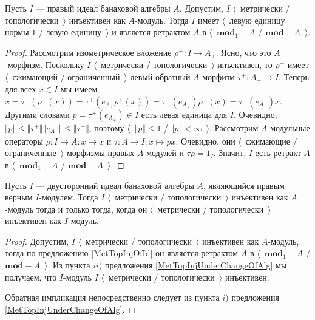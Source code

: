 \begin{proposition}\label{MetTopInjOfId} Пусть $I$ --- правый идеал банаховой алгебры $A$. Допустим, $I$ $\langle$~метрически / топологически~$\rangle$ инъективен как $A$-модуль. Тогда $I$ имеет $\langle$~левую единицу нормы $1$ / левую единицу~$\rangle$ и является ретрактом $A$ в $\langle$~$\mathbf{mod}_1-A$ / $\mathbf{mod}-A$~$\rangle$.
\end{proposition}
\begin{proof} Рассмотрим изометрическое вложение $\rho^+:I\to A_+$. Ясно, что это $A$-морфизм. Поскольку $I$ $\langle$~метрически / топологически~$\rangle$ инъективен, то $\rho^+$ имеет $\langle$~сжимающий / ограниченный~$\rangle$ левый обратный $A$-морфизм $\tau^+:A_+\to I$. Теперь для всех $x\in I$ мы имеем $x=\tau^+(\rho^+(x))=\tau^+(e_{A_+}\rho^+(x))=\tau^+(e_{A_+})\rho^+(x)=\tau^+(e_{A_+})x$. Другими словами $p=\tau^+(e_{A_+})\in I$ есть левая единица для $I$. Очевидно, $\Vert p\Vert\leq\Vert\tau^+\Vert\Vert e_{A_+}\Vert\leq\Vert\tau^+\Vert$, поэтому $\langle$~$\Vert p\Vert\leq 1$ / $\Vert p\Vert<\infty$~$\rangle$. Рассмотрим $A$-модульные операторы $
\rho:I\to A:x\mapsto x$ и $\tau:A\to I:x\mapsto p x$. Очевидно, они $\langle$~сжимающие / ограниченные~$\rangle$ морфизмы правых $A$-модулей и $\tau\rho=1_I$. Значит, $I$ есть ретракт $A$ в $\langle$~$\mathbf{mod}_1-A$ / $\mathbf{mod}-A$~$\rangle$.
\end{proof}

\begin{proposition}\label{ReduceInjIdToInjAlg} Пусть $I$ --- двусторонний идеал банаховой алгебры $A$, являющийся правым верным $I$-модулем. Тогда $I$ $\langle$~метрически / топологически~$\rangle$ инъективен как $A$-модуль тогда и только тогда, когда он $\langle$~метрически / топологически~$\rangle$ инъективен как $I$-модуль.
\end{proposition}
\begin{proof} Допустим, $I$ $\langle$~метрически / топологически~$\rangle$ инъективен как $A$-модуль, тогда по предложению \ref{MetTopInjOfId} он является ретрактом $A$ в $\langle$~$\mathbf{mod}_1-A$ / $\mathbf{mod}-A$~$\rangle$. Из пункта $ii)$ предложения \ref{MetTopInjUnderChangeOfAlg} мы получаем, что $I$-модуль $I$ $\langle$~метрически / топологически~$\rangle$ инъективен. 

Обратная импликация непосредственно следует из пункта $i)$ предложения \ref{MetTopInjUnderChangeOfAlg}.
\end{proof}
